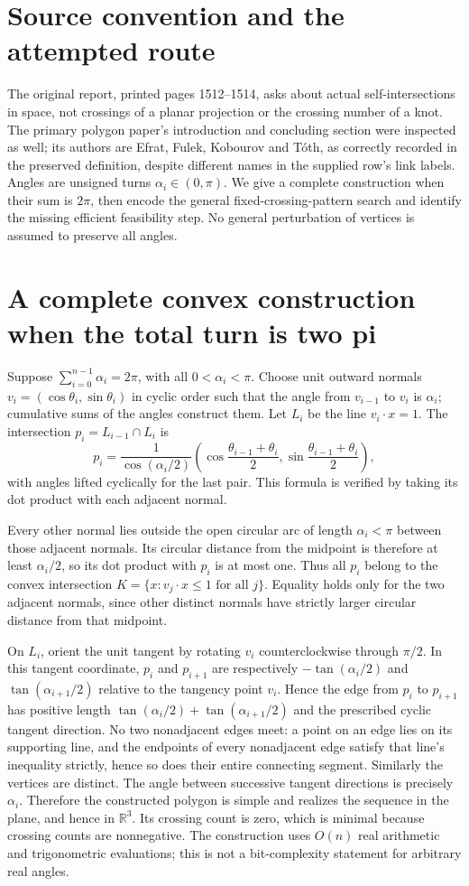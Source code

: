 \documentclass[11pt]{article}
\begin{document}
\section{Source convention and the attempted route}
The original report, printed pages 1512--1514, asks about actual
self-intersections in space, not crossings of a planar projection or
the crossing number of a knot. The primary polygon paper's introduction
and concluding section were inspected as well; its authors are Efrat,
Fulek, Kobourov and T\'oth, as correctly recorded in the preserved
definition, despite different names in the supplied row's link labels.
Angles are unsigned turns $\alpha_i\in(0,\pi)$.
We give a complete construction when their sum is $2\pi$, then encode
the general fixed-crossing-pattern search and identify the missing
efficient feasibility step. No general perturbation of vertices is
assumed to preserve all angles.

\section{A complete convex construction when the total turn is two pi}
Suppose $\sum_{i=0}^{n-1}\alpha_i=2\pi$, with all
$0<\alpha_i<\pi$. Choose unit outward normals
$v_i=(\cos\theta_i,\sin\theta_i)$ in cyclic order such that the
angle from $v_{i-1}$ to $v_i$ is $\alpha_i$; cumulative sums of
the angles construct them. Let $L_i$ be the line $v_i\cdot x=1$.
The intersection $p_i=L_{i-1}\cap L_i$ is
\[
p_i=\frac{1}{\cos(\alpha_i/2)}
 \left(\cos\frac{\theta_{i-1}+\theta_i}{2},
       \sin\frac{\theta_{i-1}+\theta_i}{2}\right),
\]
with angles lifted cyclically for the last pair. This formula is verified
by taking its dot product with each adjacent normal.

Every other normal lies outside the open circular arc of length
$\alpha_i<\pi$ between those adjacent normals. Its circular distance
from the midpoint is therefore at least $\alpha_i/2$, so its dot
product with $p_i$ is at most one. Thus all $p_i$ belong to the
convex intersection $K=\{x:v_j\cdot x\le1\text{ for all }j\}$.
Equality holds only for the two adjacent normals, since other distinct
normals have strictly larger circular distance from that midpoint.

On $L_i$, orient the unit tangent by rotating $v_i$ counterclockwise
through $\pi/2$. In this tangent coordinate, $p_i$ and $p_{i+1}$
are respectively $-\tan(\alpha_i/2)$ and
$\tan(\alpha_{i+1}/2)$ relative to the tangency point $v_i$.
Hence the edge from $p_i$ to $p_{i+1}$ has positive length
$\tan(\alpha_i/2)+\tan(\alpha_{i+1}/2)$ and the prescribed cyclic
tangent direction. No two nonadjacent edges meet: a point on an edge
lies on its supporting line, and the endpoints of every nonadjacent
edge satisfy that line's inequality strictly, hence so does their
entire connecting segment. Similarly the vertices are distinct.
The angle between successive tangent directions is precisely
$\alpha_i$. Therefore the constructed polygon is simple and realizes
the sequence in the plane, and hence in $\mathbb R^3$.
Its crossing count is zero, which is minimal because crossing counts
are nonnegative. The construction uses $O(n)$ real arithmetic and
trigonometric evaluations; this is not a bit-complexity statement for
arbitrary real angles.
\end{document}

